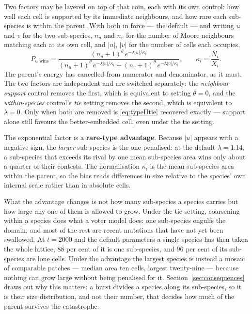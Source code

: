 \documentclass[11pt,a4paper]{article}
\begin{document}
Two factors may be layered on top of that coin, each with its own control: how well each
cell is supported by its immediate neighbours, and how rare each sub-species is within the
parent. With both in force --- the default --- and writing $u$ and $v$ for the two
sub-species, $n_u$ and $n_v$ for the number of Moore neighbours matching each at its own
cell, and $|u|$, $|v|$ for the number of cells each occupies,
\begin{equation}
  P_{u \text{ wins}}
  = \frac{(n_u+1)^{\theta}\, e^{-\lambda |u| / \kappa_i}}
         {(n_u+1)^{\theta}\, e^{-\lambda |u| / \kappa_i}
        + (n_v+1)^{\theta}\, e^{-\lambda |v| / \kappa_i}},
  \qquad
  \kappa_i = \frac{N_i}{X_i}.
  \label{eq:typeII}
\end{equation}
The parent's energy has cancelled from numerator and denominator, as it must. The two
factors are independent and are switched separately: the \emph{neighbour support} control
removes the first, which is equivalent to setting $\theta = 0$, and the
\emph{within-species} control's \emph{tie} setting removes the second, which is equivalent
to $\lambda = 0$. Only when both are removed is \eqref{eq:typeIItie} recovered exactly ---
support alone still favours the better-embedded cell, even under the tie setting.

The exponential factor is a \textbf{rare-type advantage}. Because $|u|$ appears with a
negative sign, the \emph{larger} sub-species is the one penalised: at the default
$\lambda = 1.14$, a sub-species that exceeds its rival by one mean sub-species area wins
only about a quarter of their contests. The normalisation $\kappa_i$ is the mean sub-species area
within the parent, so the bias reads differences in size relative to the species' own
internal scale rather than in absolute cells.

What the advantage changes is not how many sub-species a species carries but how large any
one of them is allowed to grow. Under the tie setting, coarsening within a species does what
a voter model does: one sub-species engulfs the domain, and most of the rest are recent
mutations that have not yet been swallowed. At $t = 2000$ and the default parameters a single
species has then taken the whole lattice, $88$ per cent of it is one sub-species, and $96$
per cent of its sub-species are lone cells. Under the advantage the largest species is
instead a mosaic of comparable patches --- median area ten cells, largest twenty-nine ---
because nothing can grow large without being penalised for it. Section~\ref{sec:consequences} draws out why this matters:
a burst divides a species along its sub-species, so it is their size distribution, and not
their number, that decides how much of the parent survives the catastrophe.
\end{document}
